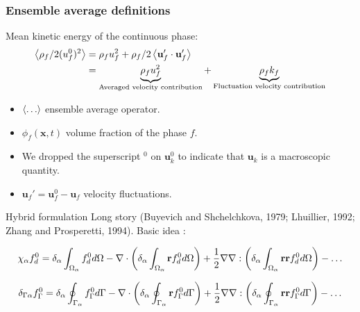 \documentclass{sintefbeamer}
\begin{document}
\begin{frame}
  \frametitle{Ensemble average definitions}
Mean kinetic energy of the continuous phase: 
\begin{align*}
  \left<\rho_f /2 (u_f^0)^2\right>
  &=
  \rho_f u_f^2
  + 
  \rho_f/2 \left<\textbf{u}_f'\cdot \textbf{u}_f'\right>\\
  &=
  \underbrace{\rho_f u_f^2}_\text{Averaged velocity contribution}
  + 
  \underbrace{\rho_f k_f}_\text{Fluctuation velocity contribution}
\end{align*}


\begin{definition}
  \begin{itemize}
    \item $\left<\ldots\right>$ ensemble average operator. 
    \item  $\phi_f (\textbf{x},t)$ volume fraction of the phase $f$. 
    \item We dropped the superscript $^0$ on $\textbf{u}^0_k$ to indicate that $\textbf{u}_k$ is a macroscopic quantity. 
    \item $\textbf{u}_f' = \textbf{u}_f^0 - \textbf{u}_f$ velocity fluctuations. 
  \end{itemize}
\end{definition}
\end{frame}

\begin{frame}{Hybrid formulation}
Long story (Buyevich and Shchelchkova, 1979; Lhuillier, 1992; Zhang and Prosperetti, 1994). Basic idea :

\begin{equation}
  \chi_\alpha f^0_d 
  =\delta_\alpha\int_{\Omega_{\alpha}} f^0_d d\Omega
  - \mathbf{\nabla}\cdot\left(\delta_\alpha\int_{\Omega_{\alpha}} \textbf{r} f^0_d d\Omega\right)
  + \frac{1}{2}\mathbf{\nabla}\mathbf{\nabla} :\left(\delta_\alpha\int_{\Omega_{\alpha}} \textbf{rr} f^0_d d\Omega\right)-
  \ldots 
  \label{eq:fd_asympt0}
\end{equation}

\begin{equation}
  \delta_{\Gamma\alpha}f_\Gamma^0  
=\delta_\alpha\oint_{\Gamma_{\alpha}} f^0_\Gamma d\Gamma
- \mathbf{\nabla}\cdot\left(\delta_\alpha\oint_{\Gamma_{\alpha}} \textbf{r} f^0_\Gamma d\Gamma\right)
+ \frac{1}{2}\mathbf{\nabla}\mathbf{\nabla} :\left(\delta_\alpha\oint_{\Gamma_{\alpha}} \textbf{rr} f^0_\Gamma d\Gamma\right)-
\ldots 
\label{eq:fG_asympt0}
\end{equation}
\end{frame}
\end{document}
